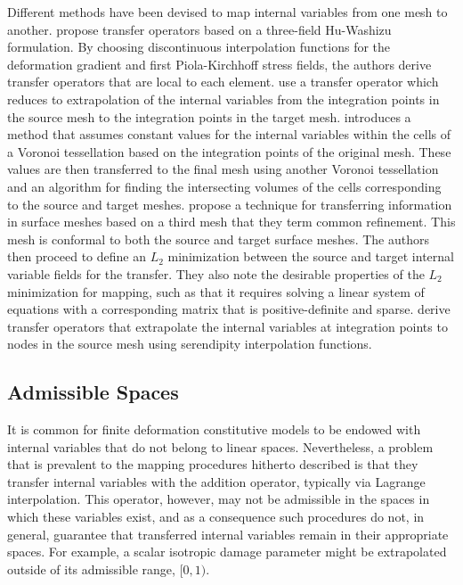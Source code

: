 \documentclass[12pt]{article}
\begin{document}
Different methods have been devised to map internal variables from one mesh to
another. \citet{Ortiz.Quigley:1991} propose transfer operators based on a
three-field Hu-Washizu formulation. By choosing discontinuous interpolation
functions for the deformation gradient and first Piola-Kirchhoff stress fields,
the authors derive transfer operators that are local to each element.
\citet{Radovitzky.Ortiz:1999} use a transfer operator which reduces to
extrapolation of the internal variables from the integration points in the
source mesh to the integration points in the target mesh.  \citet{Rashid:2002}
introduces a method that assumes constant values for the internal variables
within the cells of a Voronoi tessellation based on the integration points of
the original mesh. These values are then transferred to the final mesh using
another Voronoi tessellation and an algorithm for finding the intersecting
volumes of the cells corresponding to the source and target meshes.
\citet{Jiao.Heath:2004} propose a technique for transferring information in
surface meshes based on a third mesh that they term common refinement. This mesh
is conformal to both the source and target surface meshes. The authors then
proceed to define an $L_2$ minimization between the source and target internal
variable fields for the transfer. They also note the desirable properties of the
$L_2$ minimization for mapping, such as that it requires solving a linear system
of equations with a corresponding matrix that is positive-definite and sparse.
\citet{Bucher.etal:2007} derive transfer operators that extrapolate the internal
variables at integration points to nodes in the source mesh using serendipity
interpolation functions.

\subsection{Admissible Spaces}

It is common for finite deformation constitutive models to be endowed with
internal variables that do not belong to linear spaces. Nevertheless, a problem
that is prevalent to the mapping procedures hitherto described is that they
transfer internal variables with the addition operator, typically via Lagrange
interpolation. This operator, however, may not be admissible in the spaces in
which these variables exist, and as a consequence such procedures do not, in
general, guarantee that transferred internal variables remain in their
appropriate spaces. For example, a scalar isotropic damage parameter might be
extrapolated outside of its admissible range, $[0,1)$.
\end{document}
